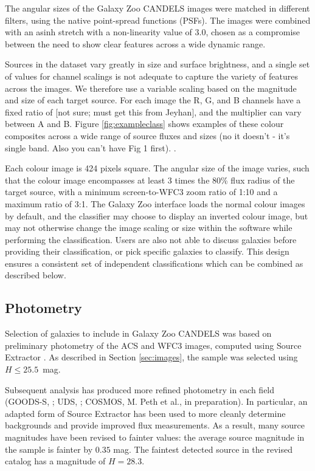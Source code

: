 \documentclass[useAMS,usenatbib]{mn2e}
\def\notebsm	{\color{titlecol}}
\begin{document}
{The angular sizes of the Galaxy Zoo CANDELS images were matched in different filters, using the native point-spread functions (PSFs). The images were combined with an asinh stretch \citep[described in detail in][]{lupton04} with a non-linearity value of {\notebsm 3.0}, chosen as a compromise between the need to show clear features across a wide dynamic range. 

Sources in the dataset vary greatly in size and surface brightness, and a single set of values for channel scalings is not adequate to capture the variety of features across the images. We therefore use a variable scaling based on the {\notebsm magnitude and size} of each target source. For each image the R, G, and B channels have a fixed ratio of {\notebsm [not sure; must get this from Jeyhan]}, and the multiplier can vary between {\notebsm A and B}. Figure \ref{fig:exampleclass} shows examples of these colour composites across a wide range of source fluxes and sizes (no it doesn't - it's single band. Also you can't have Fig 1 first). . 

Each colour image is 424 pixels square. The angular size of the image varies, such that the colour image encompasses at least {\notebsm 3 times the 80\% flux radius of the target source}, with a minimum screen-to-WFC3 zoom ratio of {\notebsm 1:10} and a maximum ratio of {\notebsm 3:1}. The Galaxy Zoo interface loads the normal colour images by default, and the classifier may choose to display an inverted colour image, but may not otherwise change the image scaling or size within the software while performing the classification. Users are also not able to discuss galaxies before providing their classification, or pick specific galaxies to classify. This design ensures a consistent set of independent classifications which can be combined as described below.



\subsection{Photometry}

Selection of galaxies to include in Galaxy Zoo CANDELS was based on preliminary photometry of the ACS and WFC3 images, computed using Source Extractor \citep{bertin96}. As described in Section \ref{sec:images}, the sample was selected using $H \leq 25.5$~mag. 

Subsequent analysis has produced more refined photometry in each field (GOODS-S, \citeauthor{guo13} \citeyear{guo13}; UDS, \citeauthor{galametz13} \citeyear{galametz13}; COSMOS, M. Peth et al., in preparation). In particular, an adapted form of Source Extractor has been used to more cleanly determine backgrounds and provide improved flux measurements. As a result, many source magnitudes have been revised to fainter values: the average source magnitude in the sample is fainter by $0.35$ mag. The faintest detected source in the revised catalog has a magnitude of $H = 28.3$.

}
\end{document}
